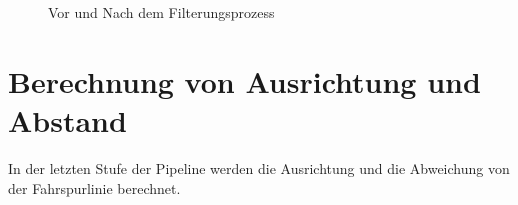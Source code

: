 \documentclass[arbeit=studie,oneside,BCOR=12mm]{ArbeitRST}
\begin{document}
\begin{figure}[h]
    \centering
    \caption{Vor und Nach dem Filterungsprozess}
    \label{gleit}
\end{figure}

\section{Berechnung von Ausrichtung und Abstand}

In der letzten Stufe der Pipeline werden die Ausrichtung und die Abweichung von
der Fahrspurlinie berechnet. 
\end{document}
